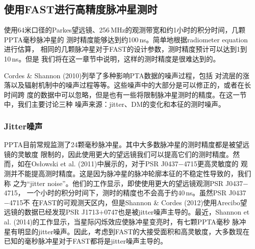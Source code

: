 \subsection{使用FAST进行高精度脉冲星测时}

使用64米口径的Parkes望远镜、256\,MHz的观测带宽和约1小时的积分时间，几颗PPTA毫秒脉冲星的
测时精度能够达到约100\,ns\supercite{Manchester13}。简单地根据radiometer equation进行估算，
相同的几颗脉冲星对于FAST的设计参数，测时精度预计可以达到1到10\,ns。但是
我们将在这一章节中说明，这样的测时精度是很难达到的。

Cordes \& Shannon (2010)\supercite{Cordes10}列举了多种影响PTA数据的噪声过程，包括
对流层的涨落以及辐射机制中的噪声过程等等。这些噪声中的大部分是可以修正的，或者在长时间跨
度的数据中可以忽略，但是也有一些将限制脉冲星测时的精度。在这一节中，我们主要讨论三种
噪声来源：jitter、DM的变化和本征的测时噪声。

\subsubsection{Jitter噪声}

PPTA目前常规监测了24颗毫秒脉冲星。其中大多数脉冲星的测时精度都是被望远镜的灵敏度
限制的，因此使用更大的望远镜我们可以提高它们的测时精度。然而，如在Os{\l}owski 
et al. (2011)\supercite{Oslowski11}中展示的，对于PSR J0437$-$4715更高灵敏度的
观测并不能提高测时精度。这是因为脉冲星的脉冲轮廓本征的不稳定性导致的，我们称
之为“jitter noise”。他们的工作显示，即使使用更大的望远镜观测PSR J0437$-$4715，
一个小时的积分时间下，测时的精度也不会高于约40\,ns。虽然PSR J0437$-$4715不
在FAST的可观测天区内，但是Shannon \& Cordes (2012)\supercite{Shannon12}使用Arecibo望
远镜的数据已经发现PSR J1713$+$0747也是被jitter噪声主导的。最近，Shannon et al. 
(2014)\supercite{Shannon14}的工作显示，当星际闪烁效应使脉冲星变亮时，有七颗PPTA毫秒
脉冲星有明显的jitter噪声。因此，考虑到FAST的大接受面积和高灵敏度，大多数现在
已知的毫秒脉冲星对于FAST都将是jitter噪声主导的。


